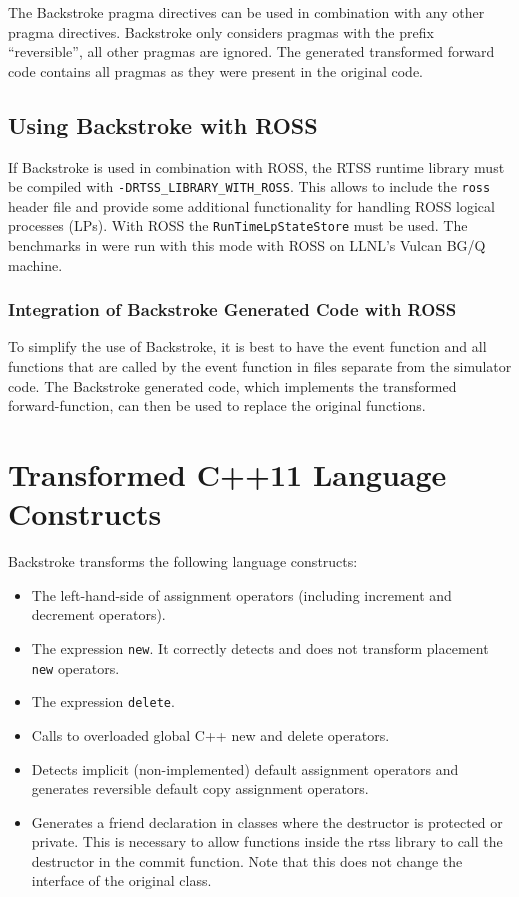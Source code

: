 \documentclass[english,12pt, titlepage]{article}      %
\begin{document}
The Backstroke pragma directives can be used in combination with any
other pragma directives. Backstroke only considers pragmas with the
prefix ``reversible'', all other pragmas are ignored. The generated
transformed forward code contains all pragmas as they were present in
the original code.

\subsection{Using Backstroke with ROSS}

If Backstroke is used in combination with ROSS, the RTSS runtime
library must be compiled with \verb+-DRTSS_LIBRARY_WITH_ROSS+. This
allows to include the \verb+ross+ header file and provide some
additional functionality for handling ROSS logical processes
(LPs). With ROSS the \verb+RunTimeLpStateStore+ must be used. The
benchmarks in \cite{backstroke2-rc2015,backstroke2-pads2016} were run
with this mode with ROSS on LLNL's Vulcan BG/Q machine.

\subsubsection{Integration of Backstroke Generated Code with ROSS}

To simplify the use of Backstroke, it is best to have the event
function and all functions that are called by the event function in
files separate from the simulator code. The Backstroke generated
code, which implements the transformed forward-function, can then be
used to replace the original functions.

\section{Transformed C++11 Language Constructs}

Backstroke transforms the following language constructs:

\begin{itemize}
\item The left-hand-side of assignment operators (including increment and
decrement operators).
\item The expression \verb+new+. It correctly detects and does not transform placement \verb+new+ operators.
\item The expression \verb+delete+. 
\item Calls to overloaded global C++ new and delete operators.
\item Detects implicit (non-implemented) default assignment operators and
generates reversible default copy assignment operators.
\item Generates a friend declaration in classes where the destructor
  is protected or private. This is necessary to allow functions inside
  the rtss library to call the destructor in the commit
  function. Note that this does not change the interface of the
  original class.
\end{itemize}
\end{document}
